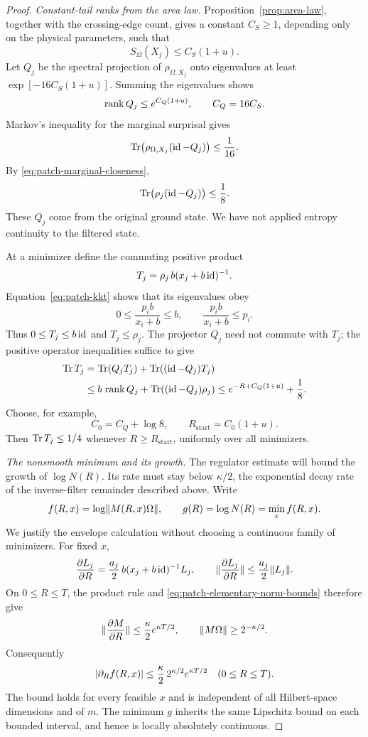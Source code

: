 \begin{proof}
\emph{Constant-tail ranks from the area law.}
Proposition~\ref{prop:area-law}, together with the crossing-edge
count, gives a constant \(C_S\geq1\), depending only on the physical
parameters, such that
\[
 S_\Omega(X_j)\leq C_S(1+u).
\]
Let \(Q_j\) be the spectral projection of \(\rho_{\Omega,X_j}\)
onto eigenvalues at least
\(\exp[-16C_S(1+u)]\).  Summing the eigenvalues shows
\[
 \operatorname{rank} Q_j\leq e^{C_Q(1+u)},\qquad C_Q=16C_S.
\]
Markov's inequality for the marginal surprisal gives
\[
 \operatorname{Tr}\bigl(\rho_{\Omega,X_j}(\operatorname{id}-Q_j)\bigr)
       \leq\frac1{16}.
\]
By \eqref{eq:patch-marginal-closeness},
\begin{equation}
 \operatorname{Tr}\bigl(\rho_j(\operatorname{id}-Q_j)\bigr)\leq\frac18.
 \label{eq:patch-constant-tail}
\end{equation}
These \(Q_j\) come from the original ground state.  We have not
applied entropy continuity to the filtered state.

At a minimizer define the commuting positive product
\[
 T_j=\rho_j\,b(x_j+b\operatorname{id})^{-1}.
\]
Equation~\eqref{eq:patch-kkt} shows that its eigenvalues obey
\[
 0\leq \frac{p_i b}{x_i+b}\leq b,
 \qquad
 \frac{p_i b}{x_i+b}\leq p_i.
\]
Thus \(0\leq T_j\leq b\operatorname{id}\) and \(T_j\leq\rho_j\).
The projector \(Q_j\) need not commute with \(T_j\); the positive
operator inequalities suffice to give
\begin{align}
 \operatorname{Tr} T_j
 &=\operatorname{Tr}(Q_jT_j)+\operatorname{Tr}((\operatorname{id}-Q_j)T_j) \notag\\
 &\leq b\,\operatorname{rank} Q_j+
          \operatorname{Tr}((\operatorname{id}-Q_j)\rho_j)
 \leq e^{-R+C_Q(1+u)}+\frac18.
 \label{eq:patch-regulator-trace}
\end{align}
Choose, for example,
\[
 C_0=C_Q+\log8,\qquad R_{\mathrm{start}}=C_0(1+u).
\]
Then \(\operatorname{Tr} T_j\leq1/4\) whenever \(R\geq R_{\mathrm{start}}\),
uniformly over all minimizers.

\emph{The nonsmooth minimum and its growth.}
The regulator estimate will bound the growth of $\log N(R)$.  Its rate
must stay below $\kappa/2$, the exponential decay rate of the
inverse-filter remainder described above.  Write
\[
 f(R,x)=\log\lVert M(R,x)\Omega\rVert,
 \qquad g(R)=\log N(R)=\min_x f(R,x).
\]
We justify the envelope calculation without choosing a continuous
family of minimizers.  For fixed \(x\),
\[
 \frac{\partial L_j}{\partial R}
       =\frac{a_j}{2}\,b(x_j+b\operatorname{id})^{-1}L_j,
 \qquad
 \lVert \frac{\partial L_j}{\partial R}\rVert
       \leq\frac{a_j}{2}\lVert L_j\rVert.
\]
On \(0\leq R\leq T\), the product rule and
\eqref{eq:patch-elementary-norm-bounds} therefore give
\[
 \lVert \frac{\partial M}{\partial R}\rVert
       \leq\frac{\kappa}{2}e^{\kappa T/2},
 \qquad
 \lVert M\Omega\rVert\geq2^{-\kappa/2}.
\]
Consequently
\begin{equation}
 \lvert \partial_R f(R,x)\rvert
       \leq \frac{\kappa}{2}\,2^{\kappa/2}e^{\kappa T/2}
       \quad(0\leq R\leq T).
 \label{eq:patch-uniform-local-lipschitz}
\end{equation}
The bound holds for every feasible \(x\) and is independent of all
Hilbert-space dimensions and of \(m\).  The minimum \(g\) inherits
the same Lipschitz bound on each bounded interval, and hence is
locally absolutely continuous.


\end{proof}
